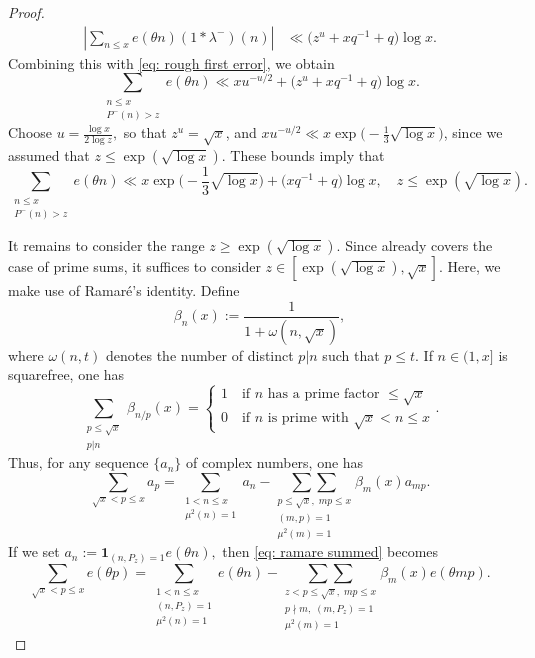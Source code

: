 \documentclass[12pt]{amsart}
\renewcommand{\leq}{\leqslant}
\renewcommand{\ge}{\geqslant}
\numberwithin{equation}{section}
\theoremstyle{plain}
\theoremstyle{definition}
\begin{document}
\begin{proof}
		\begin{align*}
			\left|
			\sum_{n \leq x} e(\theta n)(1*\lambda^-)(n)
			\right|
			&\ll
			\big(z^u+xq^{-1}+q\big)\log x .
		\end{align*}
		Combining this with \eqref{eq: rough first error}, we obtain
		$$
		\sum_{\substack{n \leq x \\ P^-(n)>z}} e(\theta n)
		\ll
		xu^{-u/2}
		+
		\big(z^u+xq^{-1}+q\big)\log x .
		$$
		Choose $u=\frac{\log x}{2 \log z},$ so that $z^u = \sqrt{x}$, and $x u^{-u/2} \ll x \exp \big(- \frac{1}{3} \sqrt{\log x}\big)$, since we assumed that $z \leq \exp(\sqrt{\log x})$. These bounds imply that 
		$$
		\sum_{\substack{n \leq x \\ P^-(n)>z}} e(\theta n)
		\ll
		x\exp\bigg(- \frac{1}{3} \sqrt{\log x}\bigg)		+
		\big(xq^{-1}+q\big)\log x, \quad z \leq \exp(\sqrt{\log x}).
		$$
		
		It remains to consider the range $z \ge \exp(\sqrt{\log x}).$ Since  already covers the case of prime sums, it suffices to consider $z \in [\exp(\sqrt{\log x}), \sqrt{x}].$ Here, we make use of Ramar\'e's identity. Define
		$$\beta_n(x) := \frac{1}{1+\omega(n,\sqrt{x})},$$
		where $\omega(n,t)$ denotes the number of distinct $p|n$ such that $p \leq t$. If $n \in (1,x]$ is squarefree, one has
		$$\sum_{\substack{p \leq \sqrt{x} \\ p | n}} \beta_{n/p}(x) = \begin{cases}
			1 \quad \text{if } n \text{ has a prime factor }\leq \sqrt{x}\\
			0 \quad \text{if } n \text{ is prime with } \sqrt{x} < n \leq x
		\end{cases}.$$
		Thus, for any sequence $\{a_n\}$ of complex numbers, one has 
		\begin{equation}\label{eq: ramare summed}
			\sum_{\sqrt{x} < p \leq x}a_p = \sum_{\substack{1< n \leq x \\ \mu^2(n) = 1}} a_n - \underset{ \substack{p \leq \sqrt{x},\;mp\leq x \\ (m,p) = 1 \\ \mu^2(m) = 1}}{\sum \sum}\beta_m(x)a_{mp}.
		\end{equation}
		If we set $a_n := \bm{1}_{(n,P_z)=1}e(\theta  n),$ then \eqref{eq: ramare summed} becomes
		\begin{equation}\label{eq: 1}
			\sum_{\sqrt{x} < p \leq x}e(\theta p) = \sum_{\substack{1< n \leq x \\ (n,P_z)=1 \\ \mu^2(n) = 1}} e(\theta n) - \underset{ \substack{z< p \leq \sqrt{x},\;mp\leq x \\ p \nmid m,\; (m,P_z) = 1 \\ \mu^2(m) = 1}}{\sum \sum}\beta_m(x)e(\theta mp).
		\end{equation}
		

\end{proof}
\end{document}
